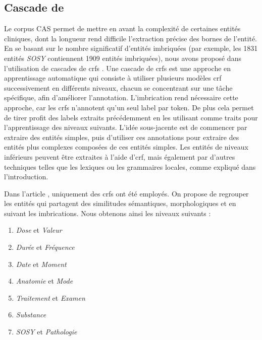 \subsection{Cascade de }
\label{sec:tal:crf}

Le corpus CAS permet de mettre en avant la complexité de certaines entités cliniques, dont la longueur rend difficile l'extraction précise des bornes de l'entité.
En se basant sur le nombre significatif d'entités imbriquées (par exemple, les \num{1831} entités \emph{SOSY} contiennent \num{1909} entités imbriquées), nous avons proposé dans \cite{minardDOINGDEFTCascade2020} l'utilisation de cascades de \glspl{crf} \cite{laffertyConditionalRandomFields2001,alexRecognisingNestedNamed2007}.
Une cascade de \glspl{crf} est une approche en apprentissage automatique qui consiste à utiliser plusieurs modèles \gls{crf} successivement en différents niveaux, chacun se concentrant sur une tâche spécifique, afin d'améliorer l'annotation.
L'imbrication rend nécessaire cette approche, car les \glspl{crf} n'annotent qu'un seul label par token.
De plus cela permet de tirer profit des labels extraits précédemment en les utilisant comme traits pour l'apprentissage des niveaux suivants.
L'idée sous-jacente est de commencer par extraire des entités simples, puis d'utiliser ces annotations pour extraire des entités plus complexes composées de ces entités simples.
Les entités de niveaux inférieurs peuvent être extraites à l'aide d'\gls{crf}, mais également par d'autres techniques telles que les lexiques ou les grammaires locales, comme expliqué dans l'introduction.

Dans l'article \cite{minardDOINGDEFTCascade2020}, uniquement des \glspl{crf} ont été employés.
On propose de regrouper les entités qui partagent des similitudes sémantiques, morphologiques et en suivant les imbrications.
Nous obtenons ainsi les niveaux suivants :
\begin{multicols}{2}
    \begin{enumerate}
        \item \emph{Dose} et \emph{Valeur}
        \item \emph{Durée} et \emph{Fréquence}
        \item \emph{Date} et \emph{Moment}
        \item \emph{Anatomie} et \emph{Mode}
        \item \emph{Traitement} et \emph{Examen}
        \item \emph{Substance}
        \item \emph{SOSY} et \emph{Pathologie}
    \end{enumerate}
\end{multicols}

